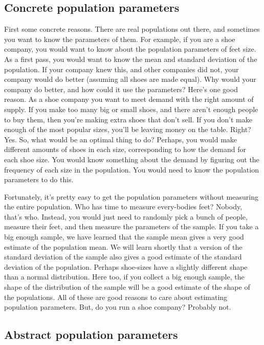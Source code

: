 \documentclass[
]{book}
\begin{document}
\subsection{Concrete population parameters}\label{concrete-population-parameters}

First some concrete reasons. There are real populations out there, and sometimes you want to know the parameters of them. For example, if you are a shoe company, you would want to know about the population parameters of feet size. As a first pass, you would want to know the mean and standard deviation of the population. If your company knew this, and other companies did not, your company would do better (assuming all shoes are made equal). Why would your company do better, and how could it use the parameters? Here's one good reason. As a shoe company you want to meet demand with the right amount of supply. If you make too many big or small shoes, and there aren't enough people to buy them, then you're making extra shoes that don't sell. If you don't make enough of the most popular sizes, you'll be leaving money on the table. Right? Yes. So, what would be an optimal thing to do? Perhaps, you would make different amounts of shoes in each size, corresponding to how the demand for each shoe size. You would know something about the demand by figuring out the frequency of each size in the population. You would need to know the population parameters to do this.

Fortunately, it's pretty easy to get the population parameters without measuring the entire population. Who has time to measure every-bodies feet? Nobody, that's who. Instead, you would just need to randomly pick a bunch of people, measure their feet, and then measure the parameters of the sample. If you take a big enough sample, we have learned that the sample mean gives a very good estimate of the population mean. We will learn shortly that a version of the standard deviation of the sample also gives a good estimate of the standard deviation of the population. Perhaps shoe-sizes have a slightly different shape than a normal distribution. Here too, if you collect a big enough sample, the shape of the distribution of the sample will be a good estimate of the shape of the populations. All of these are good reasons to care about estimating population parameters. But, do you run a shoe company? Probably not.

\subsection{Abstract population parameters}\label{abstract-population-parameters}
\end{document}
